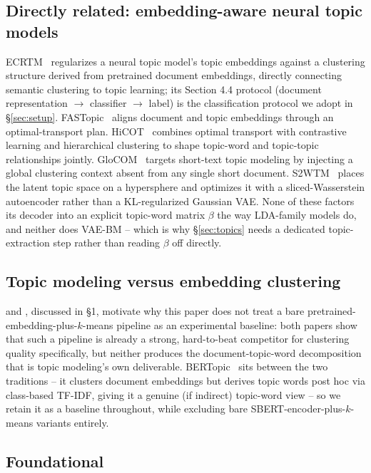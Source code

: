 \documentclass[11pt]{article}
\begin{document}
\subsection{Directly related: embedding-aware neural topic models}

ECRTM~\citep{wu2023ecrtm} regularizes a neural topic model's topic embeddings against a clustering structure derived from pretrained document embeddings, directly connecting semantic clustering to topic learning; its Section 4.4 protocol (document representation $\to$ classifier $\to$ label) is the classification protocol we adopt in \S\ref{sec:setup}. FASTopic~\citep{wu2024fastopic} aligns document and topic embeddings through an optimal-transport plan. HiCOT~\citep{hicot2025} combines optimal transport with contrastive learning and hierarchical clustering to shape topic-word and topic-topic relationships jointly. GloCOM~\citep{nguyen2025glocom} targets short-text topic modeling by injecting a global clustering context absent from any single short document. S2WTM~\citep{adhya2025s2wtm} places the latent topic space on a hypersphere and optimizes it with a sliced-Wasserstein autoencoder rather than a KL-regularized Gaussian VAE. None of these factors its decoder into an explicit topic-word matrix $\beta$ the way LDA-family models do, and neither does VAE-BM -- which is why \S\ref{sec:topics} needs a dedicated topic-extraction step rather than reading $\beta$ off directly.

\subsection{Topic modeling versus embedding clustering}

\citet{zhang2022neuraltopicclustering} and \citet{sia2020tired}, discussed in \S1, motivate why this paper does not treat a bare pretrained-embedding-plus-$k$-means pipeline as an experimental baseline: both papers show that such a pipeline is already a strong, hard-to-beat competitor for clustering quality specifically, but neither produces the document-topic-word decomposition that is topic modeling's own deliverable. BERTopic~\citep{grootendorst2022bertopic} sits between the two traditions -- it clusters document embeddings but derives topic words post hoc via class-based TF-IDF, giving it a genuine (if indirect) topic-word view -- so we retain it as a baseline throughout, while excluding bare SBERT-encoder-plus-$k$-means variants entirely.

\subsection{Foundational}
\end{document}
